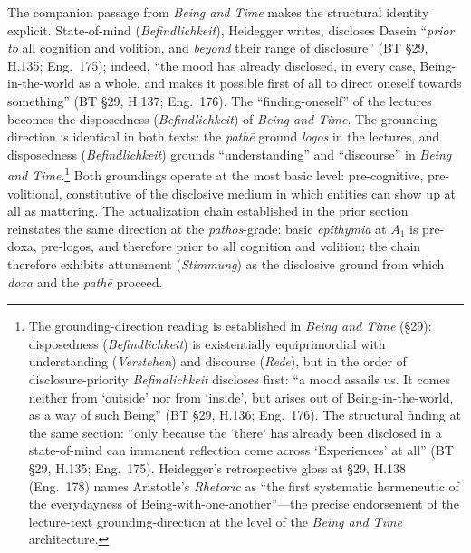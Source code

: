 \documentclass{article}
\begin{document}
 The companion passage from \textit{Being and Time} makes the structural identity explicit. State-of-mind (\textit{Befindlichkeit}), Heidegger writes, discloses Dasein ``\textit{prior to} all cognition and volition, and \textit{beyond} their range of disclosure'' (BT \S29, H.135; Eng.~175); indeed, ``the mood has already disclosed, in every case, Being-in-the-world as a whole, and makes it possible first of all to direct oneself towards something'' (BT \S29, H.137; Eng.~176). The ``finding-oneself'' of the lectures becomes the disposedness (\textit{Befindlichkeit}) of \textit{Being and Time}. The grounding direction is identical in both texts: the \textit{pathē} ground \textit{logos} in the lectures, and disposedness (\textit{Befindlichkeit}) grounds ``understanding'' and ``discourse'' in \textit{Being and Time}.\footnote{The grounding-direction reading is established in \textit{Being and Time} (\S 29): disposedness (\textit{Befindlichkeit}) is existentially equiprimordial with understanding (\textit{Verstehen}) and discourse (\textit{Rede}), but in the order of disclosure-priority \textit{Befindlichkeit} discloses first: ``a mood assails us. It comes neither from `outside' nor from `inside', but arises out of Being-in-the-world, as a way of such Being'' (BT \S 29, H.136; Eng.~176). The structural finding at the same section: ``only because the `there' has already been disclosed in a state-of-mind can immanent reflection come across `Experiences' at all'' (BT \S 29, H.135; Eng.~175). Heidegger's retrospective gloss at \S 29, H.138 (Eng.~178) names Aristotle's \textit{Rhetoric} as ``the first systematic hermeneutic of the everydayness of Being-with-one-another''---the precise endorsement of the lecture-text grounding-direction at the level of the \textit{Being and Time} architecture.} Both groundings operate at the most basic level: pre-cognitive, pre-volitional, constitutive of the disclosive medium in which entities can show up at all as mattering. The actualization chain established in the prior section reinstates the same direction at the \textit{pathos}-grade: basic \textit{epithymia} at $A_1$ is pre-doxa, pre-logos, and therefore prior to all cognition and volition; the chain therefore exhibits attunement (\textit{Stimmung}) as the disclosive ground from which \textit{doxa} and the \textit{pathē} proceed.
\end{document}
